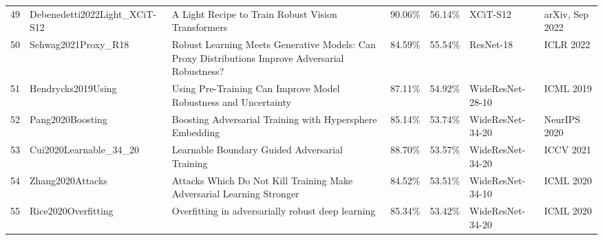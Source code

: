 \begin{table}[]
\begin{tabular}{lllllll}
    49 & Debenedetti2022Light\_XCiT-S12           & A Light Recipe to Train Robust Vision Transformers                                                                 & 90.06\%        & 56.14\%         & XCiT-S12                                                          & arXiv, Sep 2022                                            \\
    50 & Sehwag2021Proxy\_R18                     & Robust Learning Meets Generative Models: Can Proxy Distributions Improve Adversarial Robustness?                   & 84.59\%        & 55.54\%         & ResNet-18                                                         & ICLR 2022                                                  \\
    51 & Hendrycks2019Using                       & Using Pre-Training Can Improve Model Robustness and Uncertainty                                                    & 87.11\%        & 54.92\%         & WideResNet-28-10                                                  & ICML 2019                                                  \\
    52 & Pang2020Boosting                         & Boosting Adversarial Training with Hypersphere Embedding                                                           & 85.14\%        & 53.74\%         & WideResNet-34-20                                                  & NeurIPS 2020                                               \\
    53 & Cui2020Learnable\_34\_20                 & Learnable Boundary Guided Adversarial Training                                                                     & 88.70\%        & 53.57\%         & WideResNet-34-20                                                  & ICCV 2021                                                  \\
    54 & Zhang2020Attacks                         & Attacks Which Do Not Kill Training Make Adversarial Learning Stronger                                              & 84.52\%        & 53.51\%         & WideResNet-34-10                                                  & ICML 2020                                                  \\
    55 & Rice2020Overfitting                      & Overfitting in adversarially robust deep learning                                                                  & 85.34\%        & 53.42\%         & WideResNet-34-20                                                  & ICML 2020                                                  \\

\end{tabular}
\end{table}
